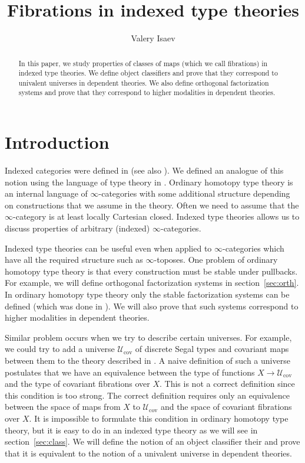 \documentclass[reqno]{mscs}
\title{Fibrations in indexed type theories}
\author{Valery Isaev}
\numberwithin{figure}{section}
\begin{document}
\maketitle

\begin{abstract}
In this paper, we study properties of classes of maps (which we call fibrations) in indexed type theories.
We define object classifiers and prove that they correspond to univalent universes in dependent theories.
We also define orthogonal factorization systems and prove that they correspond to higher modalities in dependent theories.
\end{abstract}

\section{Introduction}

Indexed categories were defined in \cite{indexed-cats} (see also \cite[B1]{elephant}).
We defined an analogue of this notion using the language of type theory in \cite{indexed-tt}.
Ordinary homotopy type theory is an internal language of $\infty$-categories with some additional structure depending on constructions that we assume in the theory.
Often we need to assume that the $\infty$-category is at least locally Cartesian closed.
Indexed type theories allows us to discuss properties of arbitrary (indexed) $\infty$-categories.

Indexed type theories can be useful even when applied to $\infty$-categories which have all the required structure such as $\infty$-toposes.
One problem of ordinary homotopy type theory is that every construction must be stable under pullbacks.
For example, we will define orthogonal factorization systems in section~\ref{sec:orth}.
In ordinary homotopy type theory only the stable factorization systems can be defined (which was done in \cite{modality-hott}).
We will also prove that such systems correspond to higher modalities in dependent theories.

Similar problem occurs when we try to describe certain universes.
For example, we could try to add a universe $\mathcal{U}_\mathrm{cov}$ of discrete Segal types and covariant maps between them to the theory described in \cite{riehl-dhott}.
A naive definition of such a universe postulates that we have an equivalence between the type of functions $X \to \mathcal{U}_\mathrm{cov}$ and the type of covariant fibrations over $X$.
This is not a correct definition since this condition is too strong.
The correct definition requires only an equivalence between the space of maps from $X$ to $\mathcal{U}_\mathrm{cov}$ and the space of covariant fibrations over $X$.
It is impossible to formulate this condition in ordinary homotopy type theory, but it is easy to do in an indexed type theory as we will see in section~\ref{sec:class}.
We will define the notion of an object classifier their and prove that it is equivalent to the notion of a univalent universe in dependent theories.
\end{document}
